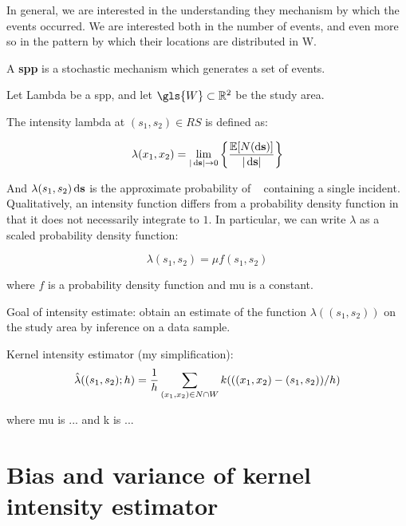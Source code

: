 In general, we are interested in the understanding they mechanism by which the events occurred.
We are interested both in the number of events, and even more so in the pattern by which their locations are distributed in \gls{W}.

\begin{defn}
    A \textbf{\gls{spp}} is a stochastic mechanism which generates a set of events.
\end{defn}

Let \gls{Lambda} be a \gls{spp}, and let $\gls{W} \subset \RS $ be the study area.

The intensity \gls{lambda} at $(s_1, s_2) \in RS$ is defined as:

\begin{equation}
\label{eq:lambda_differential}
    \lambda \xvec = \lim_{|\ds| \to 0}
        \left\{
            \frac{\mathbb{E}[N(\ds)]}%
            {|\ds|}
        \right\}
\end{equation}

And $\lambda(s_1, s_2) \mathop{}\!\mathrm{d}{\mathbf{s}}$ is the approximate probability of \ds~ containing a single incident.
Qualitatively, an intensity function differs from a probability density function in that it does not necessarily integrate to $1$.
In particular, we can write $\lambda$ as a scaled probability density function:

\begin{equation}
\label{eq:lambda_mu}
    \lambda(s_1, s_2) = \mu f\!(s_1, s_2)
\end{equation}

where $f$ is a probability density function and \gls{mu} is a constant.

Goal of intensity estimate: obtain an estimate of the function $\lambda((s_1, s_2))$ on the study area by inference on a data sample.

Kernel intensity estimator (my simplification):
\begin{equation}
\label{eq:lambda_hat}
    \hat{\lambda}((s_1, s_2); h) 
        = \frac{1}{h} \sum_{(x_1, x_2) \in N \cap W}
            {k(((x_1, x_2)-(s_1, s_2))/h)}
\end{equation}

where \gls{mu} is ... and \gls{k} is ...

\section{Bias and variance of kernel intensity estimator}
\label{sec:theory:bias_variance}

